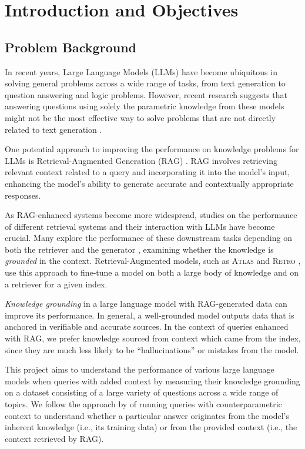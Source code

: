 \section{Introduction and Objectives}

\subsection{Problem Background}

In recent years, Large Language Models (LLMs) have become ubiquitous in solving general problems across a wide range of tasks, from text generation to question answering and logic problems.
However, recent research suggests that answering questions using solely the parametric knowledge from these models might not be the most effective way to solve problems that are not directly related to text generation \citep{treeofthoughts}.

One potential approach to improving the performance on knowledge problems for LLMs is Retrieval-Augmented Generation (RAG) \citep{rag}. RAG involves retrieving relevant context related to a query and incorporating it into the model's input, enhancing the model's ability to generate accurate and contextually appropriate responses.

As RAG-enhanced systems become more widespread, studies on the performance of different retrieval systems and their interaction with LLMs have become crucial.
Many explore the performance of these downstream tasks depending on both the retriever and the generator \citep{can_rag_models_reason,gpt3}, examining whether the knowledge is \textit{grounded} in the context.
Retrieval-Augmented models, such as \textsc{Atlas} \citep{atlas_foundational} and \textsc{Retro} \citep{retro}, use this approach to fine-tune a model on both a large body of knowledge and on a retriever for a given index.

\textit{Knowledge grounding} in a large language model with RAG-generated data can improve its performance.
In general, a well-grounded model outputs data that is anchored in verifiable and accurate sources.
In the context of queries enhanced with RAG, we prefer knowledge sourced from context which came from the index, since they are much less likely to be ``hallucinations'' or mistakes from the model.

This project aims to understand the performance of various large language models when queries with added context by measuring their knowledge grounding on a dataset consisting of a large variety of questions across a wide range of topics.
We follow the approach by \citeauthor{factual_recall} of running queries with counterparametric context to understand whether a particular answer originates from the model's inherent knowledge (i.e., its training data) or from the provided context (i.e., the context retrieved by RAG).

